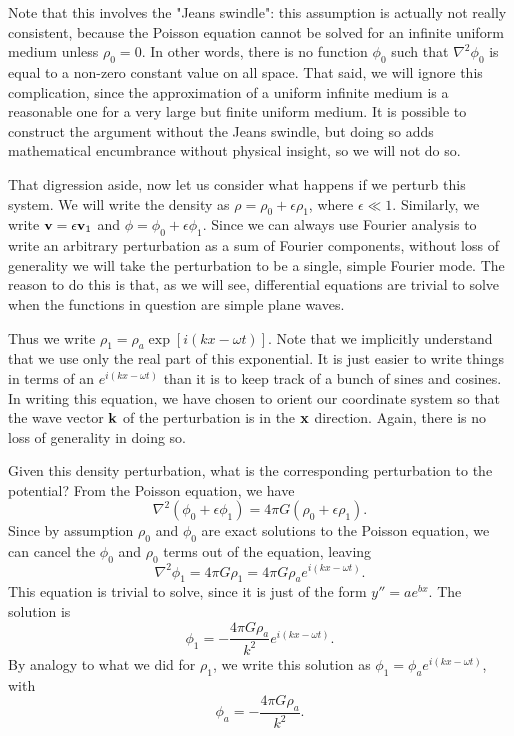 Note that this involves the "Jeans swindle": this assumption is actually not really consistent, because the Poisson equation cannot be solved for an infinite uniform medium unless $\rho_0 = 0$. In other words, there is no function $\phi_0$ such that $\nabla^2\phi_0$ is equal to a non-zero constant value on all space. That said, we will ignore this complication, since the approximation of a uniform infinite medium is a reasonable one for a very large but finite uniform medium. It is possible to construct the argument without the Jeans swindle, but doing so adds mathematical encumbrance without physical insight, so we will not do so.

That digression aside, now let us consider what happens if we perturb this system. We will write the density as $\rho = \rho_0 + \epsilon \rho_1$, where $\epsilon\ll 1$. Similarly, we write $\mathbf{v}=\epsilon \mathbf{v}_1$ and $\phi=\phi_0 + \epsilon \phi_1$. Since we can always use Fourier analysis to write an arbitrary perturbation as a sum of Fourier components, without loss of generality we will take the perturbation to be a single, simple Fourier mode. The reason to do this is that, as we will see, differential equations are trivial to solve when the functions in question are simple plane waves.

Thus we write $\rho_1 = \rho_a \exp[i(kx - \omega t)]$. Note that we implicitly understand that we use only the real part of this exponential. It is just easier to write things in terms of an $e^{i(kx-\omega t)}$ than it is to keep track of a bunch of sines and cosines. In writing this equation, we have chosen to orient our coordinate system so that the wave vector $\mathbf{k}$ of the perturbation is in the $\mathbf{x}$ direction. Again, there is no loss of generality in doing so.

Given this density perturbation, what is the corresponding perturbation to the potential? From the Poisson equation, we have
\begin{equation}
\nabla^2 (\phi_0 + \epsilon \phi_1) = 4\pi G (\rho_0 + \epsilon \rho_1).
\end{equation}
Since by assumption $\rho_0$ and $\phi_0$ are exact solutions to the Poisson equation, we can cancel the $\phi_0$ and $\rho_0$ terms out of the equation, leaving
\begin{equation}
\nabla^2 \phi_1 = 4 \pi G \rho_1 = 4\pi G \rho_a e^{i(kx-\omega t)}.
\end{equation}
This equation is trivial to solve, since it is just of the form $y'' = a e^{bx}$. The solution is
\begin{equation}
\phi_1 = -\frac{4\pi G \rho_a}{k^2} e^{i(kx - \omega t)}.
\end{equation}
By analogy to what we did for $\rho_1$, we write this solution as $\phi_1 = \phi_a e^{i(kx-\omega t)}$, with
\begin{equation}
\phi_a = -\frac{4\pi G \rho_a}{k^2}.
\end{equation}

